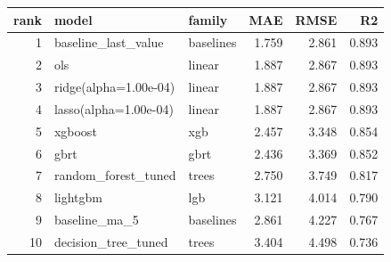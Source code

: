 \begin{tabular}{rllrrr}
\toprule
rank & model & family & MAE & RMSE & R2 \\
\midrule
1 & baseline_last_value & baselines & 1.759 & 2.861 & 0.893 \\
2 & ols & linear & 1.887 & 2.867 & 0.893 \\
3 & ridge(alpha=1.00e-04) & linear & 1.887 & 2.867 & 0.893 \\
4 & lasso(alpha=1.00e-04) & linear & 1.887 & 2.867 & 0.893 \\
5 & xgboost & xgb & 2.457 & 3.348 & 0.854 \\
6 & gbrt & gbrt & 2.436 & 3.369 & 0.852 \\
7 & random_forest_tuned & trees & 2.750 & 3.749 & 0.817 \\
8 & lightgbm & lgb & 3.121 & 4.014 & 0.790 \\
9 & baseline_ma_5 & baselines & 2.861 & 4.227 & 0.767 \\
10 & decision_tree_tuned & trees & 3.404 & 4.498 & 0.736 \\
\bottomrule
\end{tabular}
